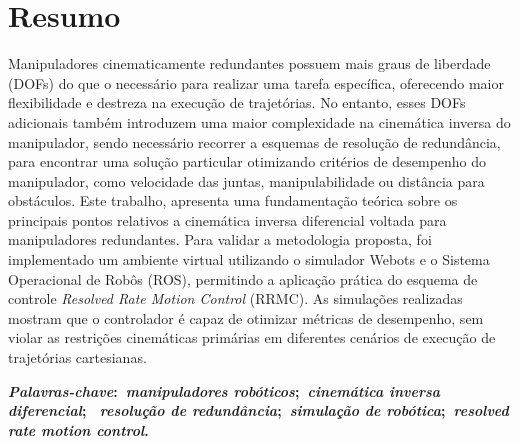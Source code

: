 \chapter*{Resumo}
\noindent Manipuladores cinematicamente redundantes possuem mais graus de liberdade (DOFs) do 
que o necessário para realizar uma tarefa específica, oferecendo maior flexibilidade e destreza na execução de trajetórias. 
No entanto, esses DOFs adicionais também introduzem uma maior complexidade na cinemática inversa do manipulador, sendo necessário 
recorrer a esquemas de resolução de redundância, para encontrar uma solução particular otimizando critérios de desempenho do manipulador,
como velocidade das juntas, manipulabilidade ou distância para obstáculos. Este trabalho, apresenta uma fundamentação teórica sobre 
os principais pontos relativos a cinemática inversa diferencial voltada para manipuladores redundantes. Para validar a metodologia proposta,
foi implementado um ambiente virtual utilizando o simulador Webots e o Sistema Operacional de Robôs (ROS), permitindo a aplicação prática do 
esquema de controle \emph{Resolved Rate Motion Control} (RRMC). As simulações realizadas mostram que o controlador é capaz de otimizar
métricas de desempenho, sem violar as restrições cinemáticas primárias em diferentes cenários de execução de trajetórias cartesianas.

\vspace{5mm}

\noindent\textbf{
    \textit{Palavras-chave}:~\textit{manipuladores robóticos};~\textit{cinemática inversa diferencial};
    ~\textit{resolução de redundância};~\textit{simulação de robótica};~\textit{resolved rate motion control}.
}
